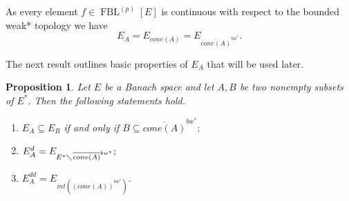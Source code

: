 \documentclass[12pt]{article}%
\newtheorem{proposition}[theorem]{Proposition}
\begin{document}
As every element $f\in\operatorname*{FBL}\nolimits^{(p)}\left[  E\right]  $ is
continuous with respect to the bounded weak* topology we have%
\[
E_{A}=E_{cone\left(  A\right)  }=E_{\overline{cone\left(  A\right)
}^{bw^{\ast}}}.
\]


The next result outlines basic properties of $E_{A}$ that will be used later.

\begin{proposition}
\label{C}Let $E$ be a Banach space and let $A,B$ be two nonempty subsets of
$E^{\ast}.$ Then the following statements hold.

\begin{enumerate}
\item[(i)] $E_{A}\subseteq E_{B}$ if and only if $B\subseteq\overline
{cone\left(  A\right)  }^{bw^{\ast}};$

\item[(ii)] $E_{A}^{d}=E_{E^{\ast}\diagdown\overline{cone\left(  A\right)
}^{bw^{\ast}}};$

\item[(iii)] $E_{A}^{dd}=E_{int\left(  \overline{\left(  cone\left(  A\right)
\right)  }^{bw^{\ast}}\right)  }.$
\end{enumerate}
\end{proposition}
\end{document}
